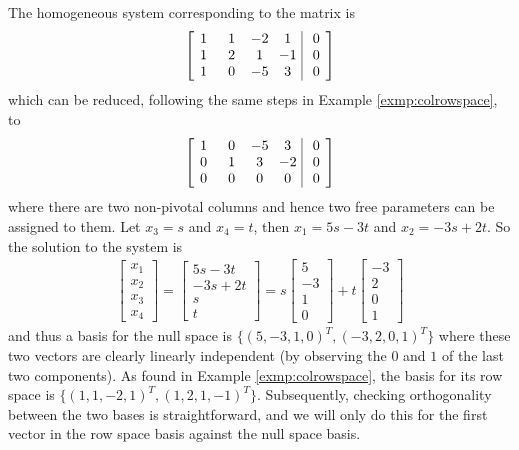 \begin{solution}
The homogeneous system corresponding to the matrix is
\begin{align*}
\left[\begin{array}{@{\,}wc{10pt}wc{10pt}wc{10pt}wc{10pt}|wc{10pt}@{\,}}
1 & 1 & -2 & 1 & 0\\
1 & 2 & 1 & -1 & 0\\
1 & 0 & -5 & 3 & 0
\end{array}\right]
\end{align*}
which can be reduced, following the same steps in Example \ref{exmp:colrowspace}, to
\begin{align*}
\left[\begin{array}{@{\,}wc{10pt}wc{10pt}wc{10pt}wc{10pt}|wc{10pt}@{\,}}
1 & 0 & -5 & 3 & 0 \\
0 & 1 & 3 & -2 & 0\\
0 & 0 & 0 & 0 & 0
\end{array}\right]
\end{align*}
where there are two non-pivotal columns and hence two free parameters can be assigned to them. Let $x_3 = s$ and $x_4 = t$, then $x_1 = 5s - 3t$ and $x_2 = -3s + 2t$. So the solution to the system is
\begin{align*}
\begin{bmatrix}
x_1 \\
x_2 \\
x_3 \\
x_4
\end{bmatrix}
=
\begin{bmatrix}
5s-3t \\
-3s+2t \\
s \\
t
\end{bmatrix}
=
s
\begin{bmatrix}
5\\
-3\\
1\\
0
\end{bmatrix}
+ t
\begin{bmatrix}
-3 \\
2 \\
0 \\
1
\end{bmatrix}
\end{align*}
and thus a basis for the null space is $\{(5,-3,1,0)^T, (-3,2,0,1)^T\}$ where these two vectors are clearly linearly independent (by observing the $0$ and $1$ of the last two components). As found in Example \ref{exmp:colrowspace}, the basis for its row space is $\{(1,1,-2,1)^T, (1,2,1,-1)^T\}$. Subsequently, checking orthogonality between the two bases is straightforward, and we will only do this for the first vector in the row space basis against the null space basis.

\end{solution}
